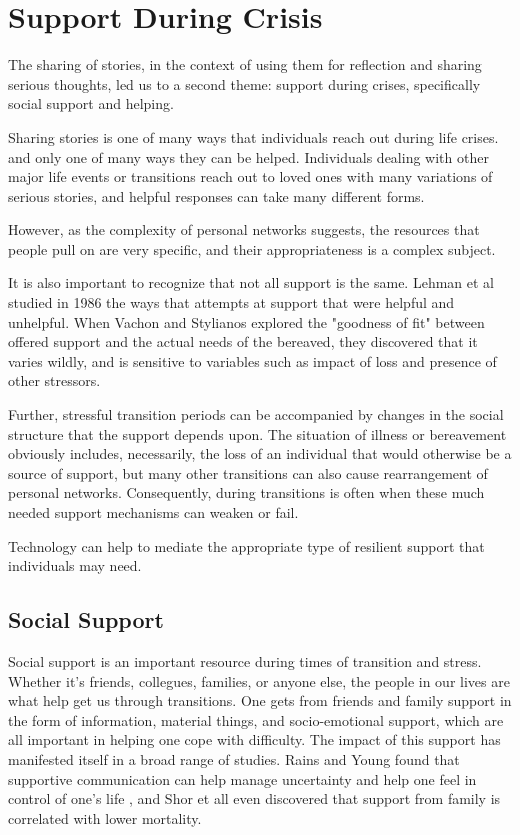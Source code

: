 \section{Support During Crisis}
  The sharing of stories,
  in the context of using them for reflection and sharing serious thoughts,
  led us to a second theme:
  support during crises,
  specifically social support and helping.

  Sharing stories is one of many ways that
  individuals reach out during life crises.
  and only one of many ways they can be helped.
  Individuals dealing with other major life events or transitions
  reach out to loved ones with many variations of serious stories,
  and helpful responses can take many different forms.

  However, as the complexity of personal networks suggests, the resources that people pull on
  are very specific,
  and their appropriateness is a complex subject.

  It is also important to recognize that not all support is the same.
  Lehman et al studied in 1986 the ways that attempts at support that were helpful and unhelpful.
  \cite{lehman_86}
  When Vachon and Stylianos explored the "goodness of fit" between offered support and the actual needs of
  the bereaved, they discovered that it varies wildly, and is sensitive to variables such as impact of loss
  and presence of other stressors.
  \cite{vachon_88}
  
  Further, stressful transition periods can be accompanied by changes in the social structure
  that the support depends upon.
  The situation of illness or bereavement obviously includes, necessarily,
  the loss of an individual that would otherwise be a source of support,
  but many other transitions can also cause rearrangement of personal networks.
  Consequently, during transitions is often when these much needed
  support mechanisms can weaken or fail.
  \cite{mikal_13}

  Technology can help to mediate the appropriate type of resilient support
  that individuals may need.

  \subsection{Social Support}
    Social support is an important resource during times of transition and stress.
    Whether it's friends, collegues, families, or anyone else, the people in our lives
    are what help get us through transitions.
    \cite{mikal_13}
    One gets from friends and family support in the form of
    information, material things, and socio-emotional support,
    which are all important in helping one cope with difficulty.
    The impact of this support has manifested itself in a broad range of studies.
    Rains and Young found that supportive communication can help manage uncertainty and
    help one feel in control of one's life \cite{rains_09},
    and Shor et all even discovered that support from
    family is correlated with lower mortality. \cite{shor_13}

